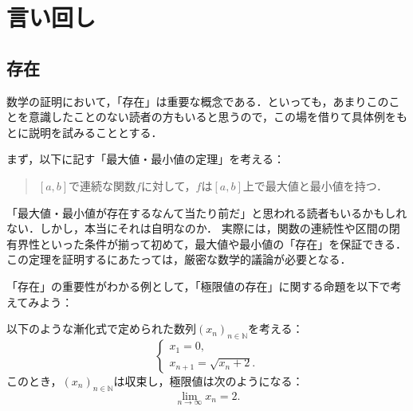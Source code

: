 \section{言い回し}
\subsection{存在}

数学の証明において，「存在」は重要な概念である．といっても，あまりこのことを意識したことのない読者の方もいると思うので，この場を借りて具体例をもとに説明を試みることとする．

まず，以下に記す「最大値・最小値の定理」を考える：
\begin{quotation}
  $[a,b]$で連続な関数$f$に対して，$f$は$[a,b]$上で最大値と最小値を持つ．
\end{quotation}

「最大値・最小値が存在するなんて当たり前だ」と思われる読者もいるかもしれない．しかし，本当にそれは自明なのか．
実際には，関数の連続性や区間の閉有界性といった条件が揃って初めて，最大値や最小値の「存在」を保証できる．この定理を証明するにあたっては，厳密な数学的議論が必要となる．

「存在」の重要性がわかる例として，「極限値の存在」に関する命題を以下で考えてみよう：

\begin{prop}{}{}
  以下のような漸化式で定められた数列$(x_n)_{n \in \mathbb{N}}$を考える：
  \[
    \begin{cases}
      x_1 =0 , \\
      x_{n+1}= \sqrt{x_n+2}.
    \end{cases}
  \]
  このとき，$(x_n)_{n \in \mathbb{N}}$は収束し，極限値は次のようになる：
  \[
    \lim_{n \to \infty} x_n =2.
  \]
\end{prop}

